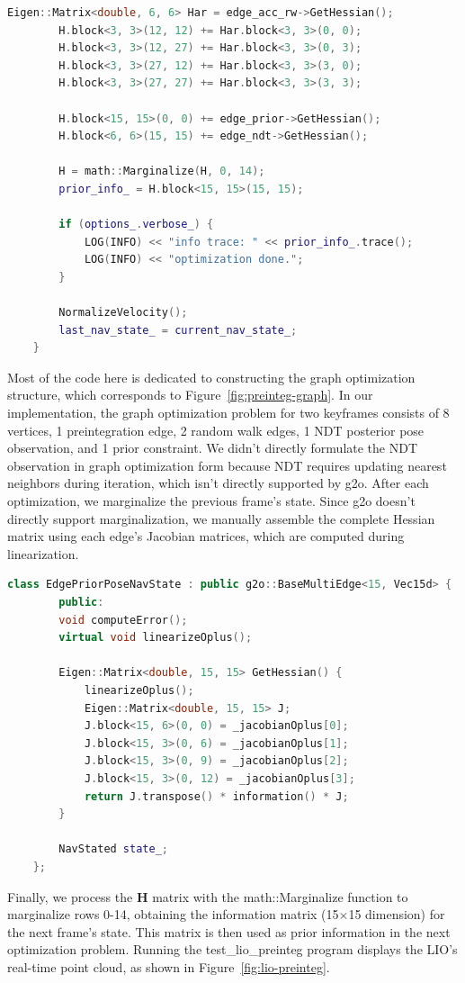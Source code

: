 \begin{lstlisting}[language=c++,caption=src/ch8/lio-preinteg/lio_preinteg.cc]
		Eigen::Matrix<double, 6, 6> Har = edge_acc_rw->GetHessian();
		H.block<3, 3>(12, 12) += Har.block<3, 3>(0, 0);
		H.block<3, 3>(12, 27) += Har.block<3, 3>(0, 3);
		H.block<3, 3>(27, 12) += Har.block<3, 3>(3, 0);
		H.block<3, 3>(27, 27) += Har.block<3, 3>(3, 3);
		
		H.block<15, 15>(0, 0) += edge_prior->GetHessian();
		H.block<6, 6>(15, 15) += edge_ndt->GetHessian();
		
		H = math::Marginalize(H, 0, 14);
		prior_info_ = H.block<15, 15>(15, 15);
		
		if (options_.verbose_) {
			LOG(INFO) << "info trace: " << prior_info_.trace();
			LOG(INFO) << "optimization done.";
		}
		
		NormalizeVelocity();
		last_nav_state_ = current_nav_state_;
	}
\end{lstlisting}

Most of the code here is dedicated to constructing the graph optimization structure, which corresponds to Figure~\ref{fig:preinteg-graph}. In our implementation, the graph optimization problem for two keyframes consists of 8 vertices, 1 preintegration edge, 2 random walk edges, 1 NDT posterior pose observation, and 1 prior constraint. We didn't directly formulate the NDT observation in graph optimization form because NDT requires updating nearest neighbors during iteration, which isn't directly supported by g2o. After each optimization, we marginalize the previous frame's state. Since g2o doesn't directly support marginalization, we manually assemble the complete Hessian matrix using each edge's Jacobian matrices, which are computed during linearization.

\begin{lstlisting}[language=c++,caption=src/common/g2o_types.h]
	class EdgePriorPoseNavState : public g2o::BaseMultiEdge<15, Vec15d> {
		public:
		void computeError();
		virtual void linearizeOplus();
		
		Eigen::Matrix<double, 15, 15> GetHessian() {
			linearizeOplus();
			Eigen::Matrix<double, 15, 15> J;
			J.block<15, 6>(0, 0) = _jacobianOplus[0];
			J.block<15, 3>(0, 6) = _jacobianOplus[1];
			J.block<15, 3>(0, 9) = _jacobianOplus[2];
			J.block<15, 3>(0, 12) = _jacobianOplus[3];
			return J.transpose() * information() * J;
		}
		
		NavStated state_;
	};
\end{lstlisting}

Finally, we process the $\bm{H}$ matrix with the math::Marginalize function to marginalize rows 0-14, obtaining the information matrix (15×15 dimension) for the next frame's state. This matrix is then used as prior information in the next optimization problem. Running the test\_lio\_preinteg program displays the LIO's real-time point cloud, as shown in Figure~\ref{fig:lio-preinteg}.

